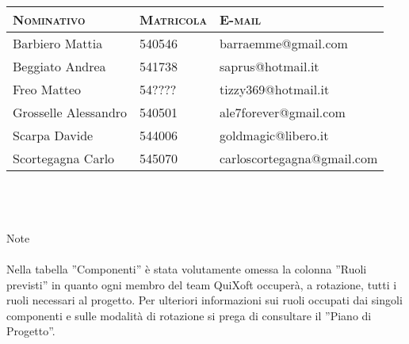 \documentclass[11pt,a4paper]{article}
\begin{document}
\begin{tabular}{|p{}|l|p{}|}
\hline
\textsc{Nominativo} & \textsc{Matricola} & \textsc{E-mail} \\
\hline
\hline
Barbiero Mattia & 540546 & barraemme@gmail.com \\
\hline
Beggiato Andrea & 541738 & saprus@hotmail.it \\
\hline
Freo Matteo & 54???? & tizzy369@hotmail.it \\
\hline
Grosselle Alessandro & 540501 & ale7forever@gmail.com \\
\hline
Scarpa Davide & 544006 & goldmagic@libero.it \\
\hline
Scortegagna Carlo & 545070 & carloscortegagna@gmail.com \\
\hline
\end{tabular} \\ \\ \\
\Large Note \\ \\
\normalsize
Nella tabella ''Componenti'' è stata volutamente omessa la colonna ''Ruoli previsti'' in quanto ogni membro del team QuiXoft occuperà, a rotazione, tutti i ruoli necessari al progetto. Per ulteriori informazioni sui ruoli occupati dai singoli componenti e sulle modalità di rotazione si prega di consultare il ''Piano di Progetto''.
\end{document}
